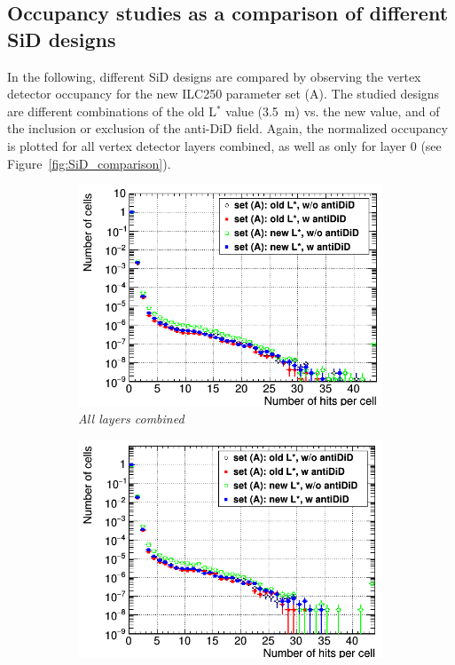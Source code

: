 \subsection{Occupancy studies as a comparison of different SiD designs}
In the following, different SiD designs are compared by observing the vertex detector occupancy for the new ILC250 parameter set (A).
The studied designs are different combinations of the old L$^*$ value (\SI{3.5}{\meter}) vs. the new value, and of the inclusion or exclusion of the anti-DiD field.
Again, the normalized occupancy is plotted for all vertex detector layers combined, as well as only for layer 0 (see Figure~\ref{fig:SiD_comparison}).
\begin{figure}[!h]
\centering
\begin{subfigure}[t]{0.45\textwidth}
\centering
\includegraphics[width=1.05\textwidth]{figures/Occupancy_Comparison_All_layers_wrt_cells_ILC250_Comparison_Set_A_All_SiD_designs_LEG.png}
\caption{\textit{All layers combined}}
\end{subfigure}
\hspace*{0.3cm}
\begin{subfigure}[t]{0.45\textwidth}
\centering
\includegraphics[width=1.05\textwidth]{figures/Occupancy_Comparison_Layer_0_numcells_ILC250_Comparison_Set_A_All_SiD_designs_LEG.png}

\end{subfigure}
\end{figure}
